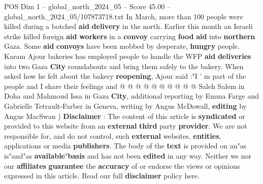 \begin{textsample}{POS Dim 1 – global\_north\_2024\_05 – Score 45.00 – global\_north\_2024\_05/107873718.txt}
In March, more than 100 people were killed during a botched \textbf{aid} \textbf{delivery} in the north.
Earlier this month an Israeli strike killed foreign \textbf{aid} \textbf{workers} in a \textbf{convoy} carrying \textbf{food} \textbf{aid} into \textbf{northern} Gaza.
Some \textbf{aid} \textbf{convoys} have been mobbed by desperate, \textbf{hungry} people.
Karam Ajour bakeries has employed people to handle the WFP \textbf{aid} \textbf{deliveries} into two Gaza \textbf{City} roundabouts and bring them safely to the bakery.
When asked how he felt about the bakery \textbf{reopening}, Ajour said :"I ' m part of the people and I share their feelings and @ @ @ @ @ @ @ @ @ @ Saleh Salem in Doha and Mahmoud Issa in Gaza \textbf{City}, additional reporting by Emma Farge and Gabrielle Tetrault-Farber in Geneva, writing by Angus McDowall, \textbf{editing} by Angus MacSwan ) \textbf{Disclaimer} : The content of this article is \textbf{syndicated} or provided to this website from an \textbf{external} \textbf{third} party \textbf{provider}.
We are not responsible for, and do not control, such \textbf{external} websites, \textbf{entities}, applications or media \textbf{publishers}.
The body of the \textbf{text} is provided on an"as is"and"as \textbf{available}"\textbf{basis} and has not been \textbf{edited} in any way.
Neither we nor our \textbf{affiliates} \textbf{guarantee} the \textbf{accuracy} of or endorse the views or opinions expressed in this article.
Read our full \textbf{disclaimer} policy here.

\end{textsample}
